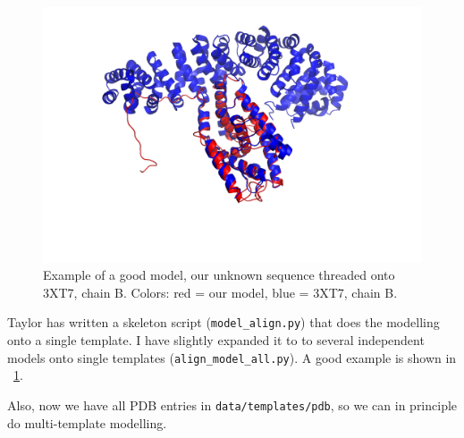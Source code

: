 \documentclass[12pt,a4paper,notitlepage,onecolumn]{article}
\title{\Title}
\author{\Author}
\date{\today}
\begin{document}
\maketitle

\begin{figure}[h!]
 \begin{center}
  \includegraphics[width=0.8\linewidth]{1yje_A-3tx7_B.png}
  \caption{Example of a good model, our unknown sequence threaded onto 3XT7, chain B. Colors: red = our model, blue = 3XT7, chain B.}
  \label{fig:1yje_A-3xt7_B}
 \end{center}
\end{figure}
Taylor has written a skeleton script (\texttt{model\_align.py}) that does the modelling onto a single template. I have slightly expanded it to to several independent models onto single templates (\texttt{align\_model\_all.py}). A good example is shown in \figurename~\ref{fig:1yje_A-3xt7_B}.

Also, now we have all PDB entries in \texttt{data/templates/pdb}, so we can in principle do multi-template modelling.
\end{document}
